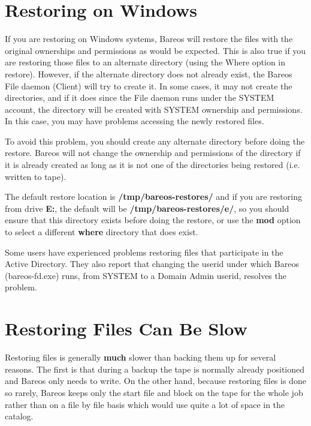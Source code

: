 \section{Restoring on Windows}
\label{Windows}

If you are restoring on Windows systems, Bareos will restore the files
with the original ownerships and permissions as would be expected.  This is
also true if you are restoring those files to an alternate directory (using
the Where option in restore).  However, if the alternate directory does not
already exist, the Bareos File daemon (Client) will try to create it.  In
some cases, it may not create the directories, and if it does since the
File daemon runs under the SYSTEM account, the directory will be created
with SYSTEM ownership and permissions.  In this case, you may have problems
accessing the newly restored files.

To avoid this problem, you should create any alternate directory before
doing the restore.  Bareos will not change the ownership and permissions of
the directory if it is already created as long as it is not one of the
directories being restored (i.e.  written to tape).

The default restore location is {\bf /tmp/bareos-restores/} and if you are
restoring from drive {\bf E:}, the default will be
{\bf /tmp/bareos-restores/e/}, so you should ensure that this directory
exists before doing the restore, or use the {\bf mod} option to
select a different {\bf where} directory that does exist.

Some users have experienced problems restoring files that participate in
the Active Directory. They also report that changing the userid under which
Bareos (bareos-fd.exe) runs, from SYSTEM to a Domain Admin userid, resolves
the problem.


\section{Restoring Files Can Be Slow}




Restoring files is generally {\bf much} slower than backing them up for several
reasons. The first is that during a backup the tape is normally already
positioned and Bareos only needs to write. On the other hand, because restoring
files is done so rarely, Bareos keeps only the start file and block on the
tape for the whole job rather than on a file by file basis which would use
quite a lot of space in the catalog.


